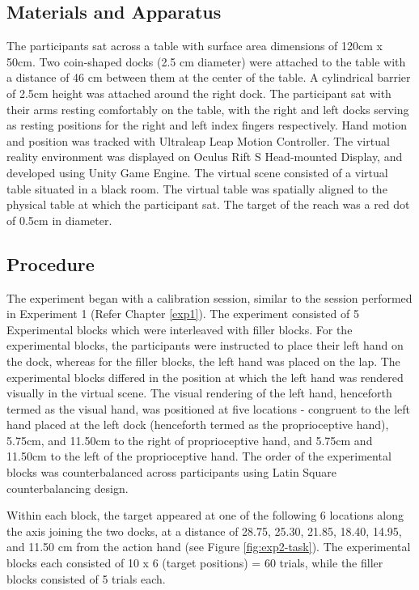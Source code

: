 \subsection{Materials and Apparatus}
The participants sat across a table with surface area dimensions of 120cm x 50cm. Two coin-shaped docks (2.5 cm diameter) were attached to the table with a distance of 46 cm between them at the center of the table. A cylindrical barrier of 2.5cm height was attached around the right dock. The participant sat with their arms resting comfortably on the table, with the right and left docks serving as resting positions for the right and left index fingers respectively. Hand motion and position was tracked with Ultraleap Leap Motion Controller. The virtual reality environment was displayed on Oculus Rift S Head-mounted Display, and developed using Unity Game Engine. The virtual scene consisted of a virtual table situated in a black room. The virtual table was spatially aligned to the physical table at which the participant sat. The target of the reach was a red dot of 0.5cm in diameter. 

\subsection{Procedure}

The experiment began with a calibration session, similar to the session performed in Experiment 1 (Refer Chapter \ref{exp1}). The experiment consisted of 5 Experimental blocks which were interleaved with filler blocks. For the experimental blocks, the participants were instructed to place their left hand on the dock, whereas for the filler blocks, the left hand was placed on the lap. The experimental blocks differed in the position at which the left hand was rendered visually in the virtual scene. The visual rendering of the left hand, henceforth termed as the visual hand, was positioned at five locations - congruent to the left hand placed at the left dock (henceforth termed as the proprioceptive hand), 5.75cm, and 11.50cm to the right of proprioceptive hand, and 5.75cm and 11.50cm to the left of the proprioceptive hand. The order of the experimental blocks was counterbalanced across participants using Latin Square counterbalancing design. 



Within each block, the target appeared at one of the following 6 locations along the axis joining the two docks, at a distance of  28.75, 25.30, 21.85, 18.40, 14.95, and 11.50 cm from the action hand (see Figure \ref{fig:exp2-task}). The experimental blocks each consisted of 10 x 6 (target positions) = 60 trials, while the filler blocks consisted of 5 trials each. 

